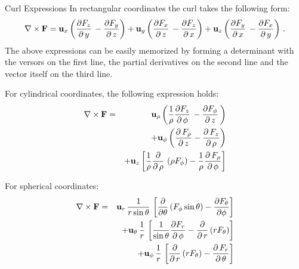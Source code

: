 \documentclass[handout,10pt]{beamer}
\begin{document}
\begin{frame}[shrink=00]{Curl Expressions}
In rectangular coordinates the curl takes the following form:
%
\begin{equation}
 \nabla \times {\bf F} = 
{\bf u}_x \left(\frac{\partial {F}_{z}}{\partial\,y}\,-\frac{\partial {F}_{y}}{\partial\,z}\right) 
 + {\bf u}_y \left(\frac{\partial {F}_{x}}{\partial\,z}\,-\frac{\partial {F}_{z}}{\partial\,x} \right) 
 +  {\bf u}_z \left(\frac{\partial {F}_{y}}{\partial\,x}\,-\frac{\partial {F}_{x}}{\partial\,y}\right) \, .
 \label{curldefr}
\end{equation}
%
The above expressions can be easily memorized by forming a determinant with the versors on the first line, the partial derivatives on the second line and the vector itself on the third line.

For cylindrical coordinates, the following expression holds:
%
\begin{eqnarray}
 \nabla \times {\bf F} & =  &
{\bf u}_\rho \left( \frac{1}{\rho} \frac{\partial {F}_{z}}{\partial\,\phi}\,-\frac{\partial {F}_{\phi}}{\partial\,z}\,\right) \nonumber \\
& & + {\bf u}_\phi \left(\frac{\partial \,{F}_{\rho}}{\partial\,z}-\frac{\partial \,{F}_{z}}{\partial\,\rho}\right)  \nonumber \\
& &  +  {\bf u}_z \left[ \frac{1}{\rho}  \frac{\partial }{\partial\,\rho}\,\left( \rho {F}_{\phi}\right) -  \frac{1}{\rho} \frac{\partial \,{F}_{\rho}}{\partial\,\phi}\right]
 \label{curldefc}
\end{eqnarray}
%

For spherical coordinates:
%
\begin{eqnarray}
 \nabla \times {\bf F} & =  &
{\bf u}_r  \, \frac{1}{r \sin \theta} \, \left[ \frac{\partial}{\partial \theta} \left( F_\phi \sin \theta\right)  - \frac{\partial F_\theta}{\partial \phi} \right]
\nonumber  \\
& &  +  {\bf u}_\theta \, \frac{1}{r} \, \left[  \frac{1}{\sin\theta} \frac{\partial F_r}{\partial\,\phi} -  \frac{\partial }{\partial\,r} \left( r F_\theta\right)\right] \nonumber  \\
& & + {\bf u}_\phi \, \frac{1}{r} \, \left[ \frac{\partial }{\partial\,r}\left( r F_\theta \right)-\frac{\partial \,{F}_{r}}{\partial\,\theta}\right] 
 \label{curldefs}
\end{eqnarray}
%


\end{frame}
\end{document}
